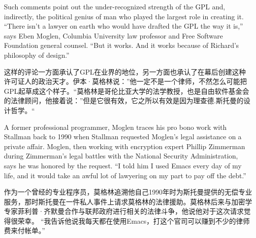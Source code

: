 \ifdefined\eng
Such comments point out the under-recognized strength of the GPL and, indirectly, the political genius of man who played the largest role in creating it. ``There isn't a lawyer on earth who would have drafted the GPL the way it is,'' says Eben Moglen, Columbia University law professor and Free Software Foundation general counsel. ``But it works. And it works because of Richard's philosophy of design.''
\fi

\ifdefined\chs
这样的评论一方面承认了GPL在业界的地位，另一方面也承认了在幕后创建这种许可证人的政治天才。伊本·莫格林说：''他一定不是一个律师，不然怎么可能把GPL起草成这个样子。``莫格林是哥伦比亚大学的法学教授，也是自由软件基金会的法律顾问，他接着说：''但是它很有效，它之所以有效是因为理查德.斯托曼的设计哲学。``
\fi

\ifdefined\eng
A former professional programmer, Moglen traces his pro bono work with Stallman back to 1990 when Stallman requested Moglen's legal assistance on a private affair. Moglen, then working with encryption expert Phillip Zimmerman during Zimmerman's legal battles with the National Security Administration, says he was honored by the request.%
``I told him I used Emacs every day of my life, and it would take an awful lot of lawyering on my part to pay off the debt.''
\fi

\ifdefined\chs
作为一个曾经的专业程序员，莫格林追溯他自己1990年时为斯托曼提供的无偿专业服务，那时斯托曼在一件私人事件上请求莫格林的法律援助。莫格林后来与加密学专家菲利普·齐默曼合作与联邦政府进行相关的法律斗争，他说他对于这次请求觉得很荣幸。%
``我告诉他说我每天都在使用Emacs，打这个官司可以赚到不少的律师费来付帐单。''
\fi

